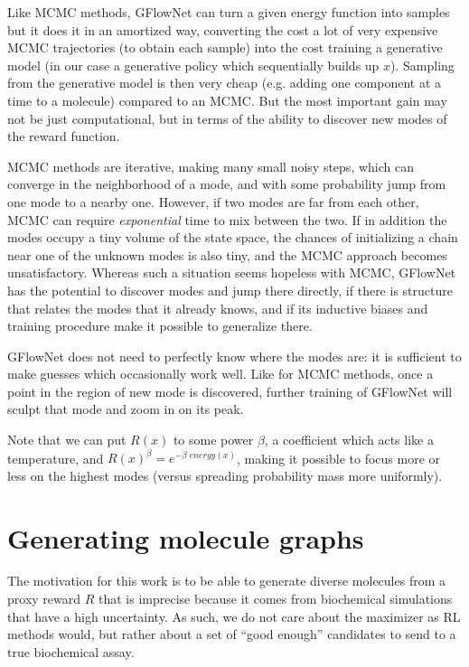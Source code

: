 Like MCMC methods, GFlowNet can turn a given energy function into samples but it does it in an amortized way, converting the cost a lot of very expensive MCMC trajectories (to obtain each sample) into the cost training a generative model (in our case a generative policy which sequentially builds up $x$). Sampling from the generative model is then very cheap (e.g. adding one component at a time to a molecule) compared to an MCMC. But the most important gain may not be just computational, but in terms of the ability to discover new modes of the reward function. 

MCMC methods are iterative, making many small noisy steps, which can converge in the neighborhood of a mode, and with some probability jump from one mode to a nearby one. However, if two modes are far from each other, MCMC can require \emph{exponential} time to mix between the two. If in addition the modes occupy a tiny volume of the state space, the chances of initializing a chain near one of the unknown modes is also tiny, and the MCMC approach becomes unsatisfactory. Whereas such a situation seems hopeless with MCMC, GFlowNet has the potential to discover modes and jump there directly, if there is structure that relates the modes that it already knows, and if its inductive biases and training procedure make it possible to generalize there. 

GFlowNet does not need to perfectly know where the modes are: it is sufficient to make guesses which occasionally work well. Like for MCMC methods, once a point in the region of new mode is discovered, further training of GFlowNet will sculpt that mode and zoom in on its peak.  

Note that we can put $R(x)$ to some power $\beta$, a coefficient which acts like a temperature, and $R(x)^\beta = e^{-\beta\; energy(x)}$, making it possible to focus more or less on the highest modes (versus spreading probability mass more uniformly).

\section{Generating molecule graphs}

The motivation for this work is to be able to generate diverse molecules from a proxy reward $R$ that is imprecise because it comes from biochemical simulations that have a high uncertainty. As such, we do not care about the maximizer as RL methods would, but rather about a set of ``good enough'' candidates to send to a true biochemical assay.

